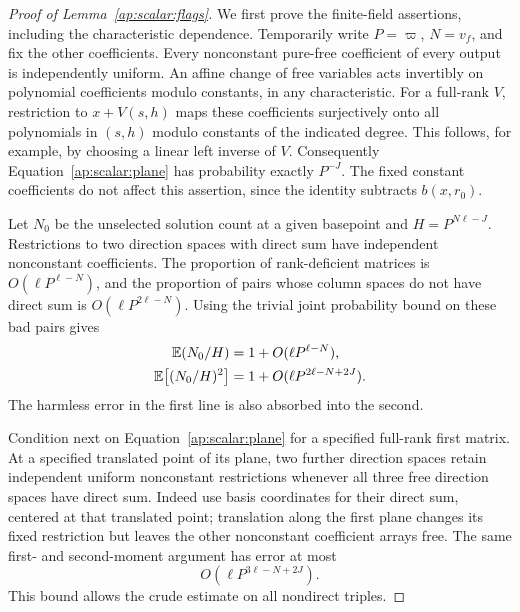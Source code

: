 \begin{proof}[Proof of Lemma~\ref{ap:scalar:flags}]
We first prove the finite-field assertions, including the characteristic
dependence. Temporarily write $P=\varpi$, $N=v_f$, and fix the other
coefficients. Every nonconstant pure-free coefficient of every output
is independently uniform. An affine change of free variables acts
invertibly on polynomial coefficients modulo constants, in any
characteristic. For a full-rank $V$, restriction to $x+V(s,h)$ maps
these coefficients surjectively onto all polynomials in $(s,h)$ modulo
constants of the indicated degree. This follows, for example, by
choosing a linear left inverse of $V$. Consequently
Equation~\eqref{ap:scalar:plane} has probability exactly $P^{-J}$.
The fixed constant coefficients do not affect this assertion, since
the identity subtracts $b(x,r_0)$.

Let $N_0$ be the unselected solution count at a given basepoint and
$H=P^{N\ell-J}$. Restrictions to two direction spaces with direct sum
have independent nonconstant coefficients. The proportion of
rank-deficient matrices is $O(\ell P^{\ell-N})$, and the proportion
of pairs whose column spaces do not have direct sum is
$O(\ell P^{2\ell-N})$. Using the trivial joint probability bound on
these bad pairs gives
\begin{align}
 \mathbb E(N_0/H)&=1+O(\ell P^{\ell-N}),\label{ap:scalar:plane-first}\\
 \mathbb E\bigl[(N_0/H)^2\bigr]&=1+O(\ell P^{2\ell-N+2J}).
                       \label{ap:scalar:plane-second}
\end{align}
The harmless error in the first line is also absorbed into the second.

Condition next on Equation~\eqref{ap:scalar:plane} for a specified
full-rank first matrix. At a specified translated point of its plane,
two further direction spaces retain independent uniform nonconstant
restrictions whenever all three free direction spaces have direct sum.
Indeed use basis coordinates for their direct sum, centered at that
translated point; translation along the first plane changes its fixed
restriction but leaves the other nonconstant coefficient arrays free.
The same first- and second-moment argument has error at most
\begin{equation}\label{ap:scalar:conditional-moment}
                   O(\ell P^{3\ell-N+2J}).
\end{equation}
This bound allows the crude estimate on all nondirect triples.


\end{proof}
